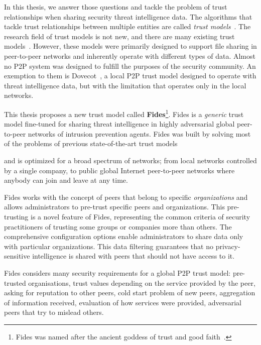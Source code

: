 In this thesis, we answer those questions and tackle the problem of trust relationships when sharing security threat intelligence data.
The algorithms that tackle trust relationships between multiple entities are called \textit{trust models}~\cite{wang2003trust}.
The research field of trust models is not new, and there are many existing trust models~\cite{abera2019sadan, sort, christensen2014hybrid, 1562680, huynh2006integrated, kamvar2003eigentrust, li2014design, pinyol2013computational, xiong2004peertrust}.
However, these models were primarily designed to support file sharing in peer-to-peer networks and inherently operate with different types of data. Almost no P2P system was designed to fulfill the purposes of the security community.
An exemption to them is Dovecot~\cite{dita}, a local P2P trust model designed to operate with threat intelligence data, but with the limitation that operates only in the local networks.

This thesis proposes a new trust model called \textbf{Fides}\footnote{Fides was named after the ancient goddess of trust and good faith~\cite{enwiki:1086924565}.}.
Fides is a \textit{generic} trust model fine-tuned for sharing threat intelligence in highly adversarial global peer-to-peer networks of intrusion prevention agents.
Fides was built by solving most of the problems of previous state-of-the-art trust models~\cite{sort, dita}

and is optimized for a broad spectrum of networks; from local networks controlled by a single company, to public global Internet peer-to-peer networks where anybody can join and leave at any time.

Fides works with the concept of peers that belong to specific \textit{organizations} and allows administrators to pre-trust specific peers and organizations. This pre-trusting is a novel feature of Fides, representing the common criteria of security practitioners of trusting some groups or companies more than others. The comprehensive configuration options enable administrators to share data only with particular organizations. This data filtering guarantees that no privacy-sensitive intelligence is shared with peers that should not have access to it.

Fides considers many security requirements for a global P2P trust model: pre-trusted organisations, trust values depending on the service provided by the peer, asking for reputation to other peers, cold start problem of new peers, aggregation of information received, evaluation of how services were provided, adversarial peers that try to mislead others.


